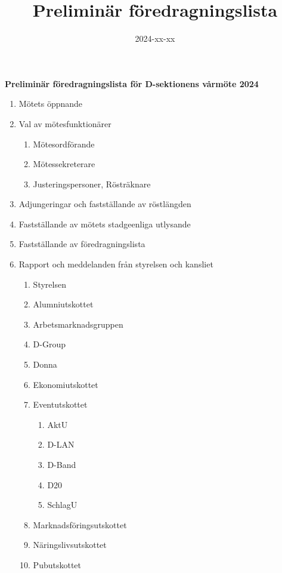 \documentclass{datateknologsektionen-document}
\title{Preliminär föredragningslista}
\date{2024-xx-xx}
\begin{document}
\large
\begin{center}
  {\LARGE\bfseries Preliminär föredragningslista för D-sektionens vårmöte 2024}
  \vspace{2mm}
\end{center}

\Large
\begin{enumerate}[topsep=0pt,itemsep=1ex]
  \item Mötets öppnande
  \item Val av mötesfunktionärer
        \begin{enumerate}[label*=\arabic*.,leftmargin=3em]
          \item Mötesordförande
          \item Mötessekreterare
          \item Justeringspersoner, Rösträknare
        \end{enumerate}
  \item Adjungeringar och fastställande av röstlängden
  \item Fastställande av mötets stadgeenliga utlysande
  \item Fastställande av föredragningslista
  \item Rapport och meddelanden från styrelsen och kansliet
        \begin{enumerate}[label*=\arabic*.,leftmargin=3em]
          \item Styrelsen
          \item Alumniutskottet
          \item Arbetsmarknadsgruppen
          \item D-Group
          \item Donna
          \item Ekonomiutskottet
          \item Eventutskottet
            \begin{enumerate}[label*=\arabic*.,leftmargin=2em]
                \item AktU
                \item D-LAN
                \item D-Band
                \item D20
                \item SchlagU
            \end{enumerate}
          \item Marknadsföringsutskottet
          \item Näringslivsutskottet
          \item Pubutskottet

\end{enumerate}
\end{enumerate}
\end{document}
